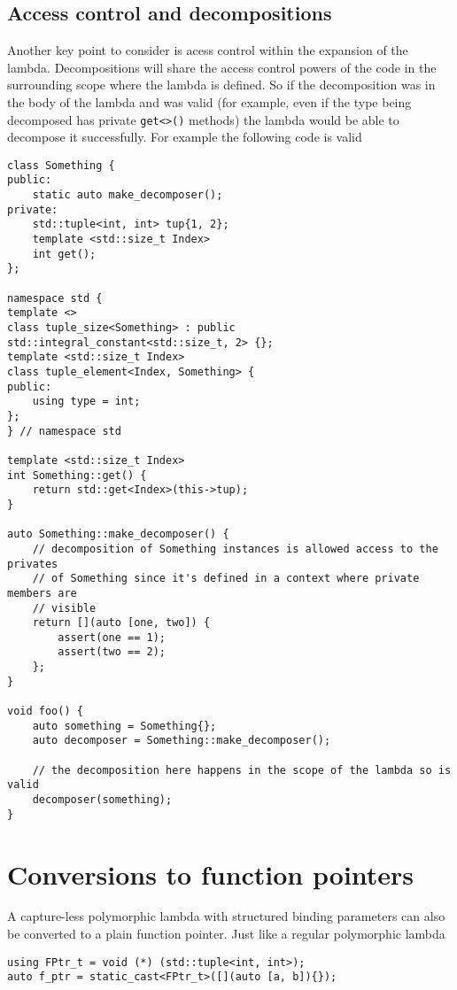 \documentclass{article}
\begin{document}
\subsection{Access control and decompositions}
Another key point to consider is acess control within the expansion of the
lambda.  Decompositions will share the access control powers of the code in
the surrounding scope where the lambda is defined.  So if the decomposition
was in the body of the lambda and was valid (for example, even if the type
being decomposed has private \texttt{get<>()} methods)  the lambda would be
able to decompose it successfully.  For example the following code is valid

\begin{lstlisting}
class Something {
public:
    static auto make_decomposer();
private:
    std::tuple<int, int> tup{1, 2};
    template <std::size_t Index>
    int get();
};

namespace std {
template <>
class tuple_size<Something> : public std::integral_constant<std::size_t, 2> {};
template <std::size_t Index>
class tuple_element<Index, Something> {
public:
    using type = int;
};
} // namespace std

template <std::size_t Index>
int Something::get() {
    return std::get<Index>(this->tup);
}

auto Something::make_decomposer() {
    // decomposition of Something instances is allowed access to the privates
    // of Something since it's defined in a context where private members are
    // visible
    return [](auto [one, two]) {
        assert(one == 1);
        assert(two == 2);
    };
}

void foo() {
    auto something = Something{};
    auto decomposer = Something::make_decomposer();

    // the decomposition here happens in the scope of the lambda so is valid
    decomposer(something);
}
\end{lstlisting}


\section{Conversions to function pointers}
A capture-less polymorphic lambda with structured binding parameters can also
be converted to a plain function pointer.  Just like a regular polymorphic
lambda

\begin{lstlisting}
using FPtr_t = void (*) (std::tuple<int, int>);
auto f_ptr = static_cast<FPtr_t>([](auto [a, b]){});
\end{lstlisting}
\end{document}
